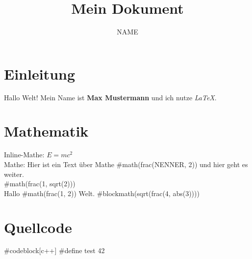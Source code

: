 \documentclass{article}
\title{Mein Dokument}
\author{NAME}
\begin{document}
\maketitle

\section{Einleitung}
Hallo Welt!  
Mein Name ist \textbf{Max Mustermann} und ich nutze \textit{LaTeX}.

\section{Mathematik}
Inline-Mathe: $E = mc^2$  \\
Mathe: Hier ist ein Text über Mathe #math(frac(NENNER, 2)) und hier geht es weiter.\\  



#math(frac(1, sqrt(2))) \\



Hallo #math(frac(1, 2)) Welt.  
#blockmath(sqrt(frac(4, abs(3))))



\section{Quellcode}

#codeblock[c++]{
#define test 42
}
\end{document}
